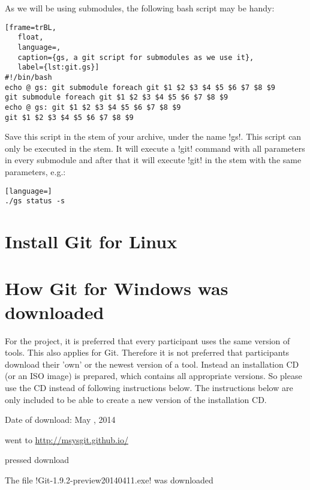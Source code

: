 \noindent
As we will be using submodules, the following bash script may be handy:

\begin{lstlisting}[frame=trBL,
   float,
   language=,
   caption={gs, a git script for submodules as we use it},
   label={lst:git.gs}]
#!/bin/bash
echo @ gs: git submodule foreach git $1 $2 $3 $4 $5 $6 $7 $8 $9
git submodule foreach git $1 $2 $3 $4 $5 $6 $7 $8 $9
echo @ gs: git $1 $2 $3 $4 $5 $6 $7 $8 $9
git $1 $2 $3 $4 $5 $6 $7 $8 $9
\end{lstlisting}

\noindent
Save this script in the stem of your archive, under the name !gs!. 
This script can only be executed in the stem.
It will execute a !git! command with all parameters in every
submodule and after that it will execute !git! in the stem with the same
parameters, e.g.:

\begin{lstlisting}[language=]
./gs status -s
\end{lstlisting}

\section{Install Git for Linux \label{sec:git.install.lin}}

\tbc

\section{How Git for Windows was downloaded }

For the project, it is preferred that every participant uses the same version
of tools. This also applies for Git. Therefore it is not preferred that
participants download their 'own' or the newest version of a tool. Instead an
installation CD (or an ISO image) is prepared, which contains all appropriate
versions. So please use the CD instead of following instructions below. The
instructions below are only included to be able to create a new version of the
installation CD.

\begin{itemize*}
\item Date of download: May , 2014
\end{itemize*}
\begin{enumerate*}
\item went to \url{http://msysgit.github.io/}
\item pressed download
\item The file !Git-1.9.2-preview20140411.exe! was downloaded
\end{enumerate*}

